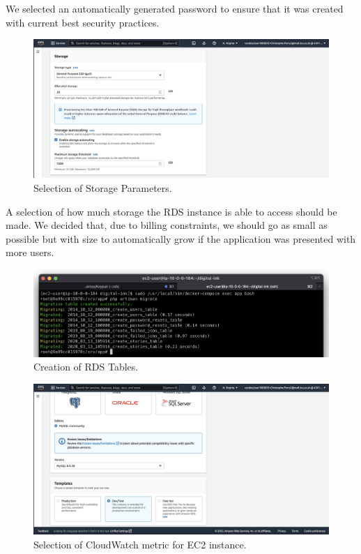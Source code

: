We selected an automatically generated password to ensure that it was created with current best security practices.

\begin{figure}[!htbp]
    \centering
    \includegraphics[width=\textwidth]{resources/rds/rds-storage}
    \caption{Selection of Storage Parameters.}
    \label{fig:rds-storage}
\end{figure}

A selection of how much storage the RDS instance is able to access should be made.
We decided that, due to billing constraints, we should go as small as possible but with size to automatically grow if
the application was presented with more users.

\begin{figure}[!htbp]
    \centering
    \includegraphics[width=\textwidth]{resources/rds/rds-tables-creation}
    \caption{Creation of RDS Tables.}
    \label{fig:rds-tables}
\end{figure}


\begin{figure}[!htbp]
\centering
\includegraphics[width=\textwidth]{resources/rds/rds-templates}
\caption{Selection of CloudWatch metric for EC2 instance.}
\label{fig:rds-templates}
\end{figure}


